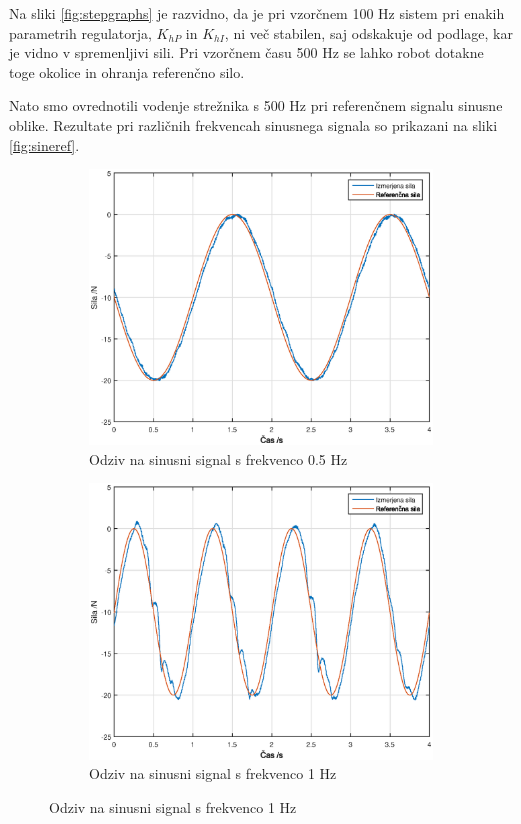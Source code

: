 \documentclass[a4paper]{article}
\begin{document}
Na sliki \ref{fig:stepgraphs} je razvidno, da je pri vzorčnem 100 Hz sistem pri enakih parametrih regulatorja, $K_{hP}$ in $K_{hI}$, ni več stabilen, saj odskakuje od podlage, kar je vidno v spremenljivi sili. Pri vzorčnem času 500 Hz se lahko robot dotakne toge okolice in ohranja referenčno silo.

Nato smo ovrednotili vodenje strežnika s 500 Hz pri referenčnem signalu sinusne oblike. Rezultate pri različnih frekvencah sinusnega signala so prikazani na sliki \ref{fig:sineref}.

\begin{figure}[!ht]
	
\centering

	\begin{subfigure}[b]{0.4\textwidth}
		\includegraphics[width=\textwidth]{./slike/figure_5_hz.eps}
		\caption{Odziv na sinusni signal s frekvenco 0.5 Hz}
	\end{subfigure}

	\begin{subfigure}[b]{0.4\textwidth}
		\includegraphics[width=\textwidth]{./slike/figure_10_hz.eps}
		\caption{Odziv na sinusni signal s frekvenco 1 Hz}
	\end{subfigure}
	

\end{figure}
\end{document}
